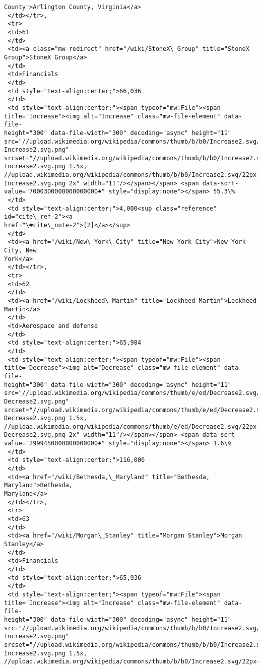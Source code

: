 \documentclass[11pt]{article}
\begin{document}
\begin{tcolorbox}[breakable, size=fbox, boxrule=.5pt, pad at break*=1mm, opacityfill=0]
\begin{Verbatim}[commandchars=\\\{\}]
County">Arlington County, Virginia</a>
 </td></tr>,
 <tr>
 <td>61
 </td>
 <td><a class="mw-redirect" href="/wiki/StoneX\_Group" title="StoneX
Group">StoneX Group</a>
 </td>
 <td>Financials
 </td>
 <td style="text-align:center;">66,036
 </td>
 <td style="text-align:center;"><span typeof="mw:File"><span
title="Increase"><img alt="Increase" class="mw-file-element" data-file-
height="300" data-file-width="300" decoding="async" height="11"
src="//upload.wikimedia.org/wikipedia/commons/thumb/b/b0/Increase2.svg/11px-
Increase2.svg.png"
srcset="//upload.wikimedia.org/wikipedia/commons/thumb/b/b0/Increase2.svg/17px-
Increase2.svg.png 1.5x,
//upload.wikimedia.org/wikipedia/commons/thumb/b/b0/Increase2.svg/22px-
Increase2.svg.png 2x" width="11"/></span></span> <span data-sort-
value="7000300000000000000♠" style="display:none"></span> 55.3\%
 </td>
 <td style="text-align:center;">4,000<sup class="reference" id="cite\_ref-2"><a
href="\#cite\_note-2">[2]</a></sup>
 </td>
 <td><a href="/wiki/New\_York\_City" title="New York City">New York City, New
York</a>
 </td></tr>,
 <tr>
 <td>62
 </td>
 <td><a href="/wiki/Lockheed\_Martin" title="Lockheed Martin">Lockheed Martin</a>
 </td>
 <td>Aerospace and defense
 </td>
 <td style="text-align:center;">65,984
 </td>
 <td style="text-align:center;"><span typeof="mw:File"><span
title="Decrease"><img alt="Decrease" class="mw-file-element" data-file-
height="300" data-file-width="300" decoding="async" height="11"
src="//upload.wikimedia.org/wikipedia/commons/thumb/e/ed/Decrease2.svg/11px-
Decrease2.svg.png"
srcset="//upload.wikimedia.org/wikipedia/commons/thumb/e/ed/Decrease2.svg/17px-
Decrease2.svg.png 1.5x,
//upload.wikimedia.org/wikipedia/commons/thumb/e/ed/Decrease2.svg/22px-
Decrease2.svg.png 2x" width="11"/></span></span> <span data-sort-
value="2999450000000000000♠" style="display:none"></span> 1.6\%
 </td>
 <td style="text-align:center;">116,000
 </td>
 <td><a href="/wiki/Bethesda,\_Maryland" title="Bethesda, Maryland">Bethesda,
Maryland</a>
 </td></tr>,
 <tr>
 <td>63
 </td>
 <td><a href="/wiki/Morgan\_Stanley" title="Morgan Stanley">Morgan Stanley</a>
 </td>
 <td>Financials
 </td>
 <td style="text-align:center;">65,936
 </td>
 <td style="text-align:center;"><span typeof="mw:File"><span
title="Increase"><img alt="Increase" class="mw-file-element" data-file-
height="300" data-file-width="300" decoding="async" height="11"
src="//upload.wikimedia.org/wikipedia/commons/thumb/b/b0/Increase2.svg/11px-
Increase2.svg.png"
srcset="//upload.wikimedia.org/wikipedia/commons/thumb/b/b0/Increase2.svg/17px-
Increase2.svg.png 1.5x,
//upload.wikimedia.org/wikipedia/commons/thumb/b/b0/Increase2.svg/22px-

\end{Verbatim}
\end{tcolorbox}
\end{document}
